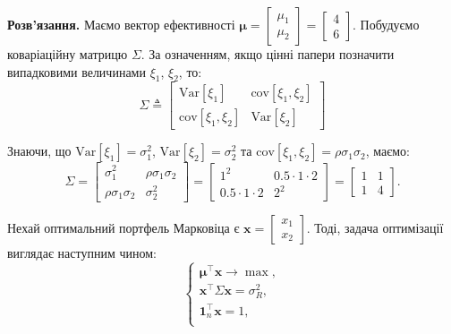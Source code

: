\documentclass{test_template}
\begin{document}
\textbf{Розв'язання.} Маємо вектор ефективності $\boldsymbol{\mu} = \begin{bmatrix}
    \mu_1 \\ 
    \mu_2 \end{bmatrix} = \begin{bmatrix} 4 \\ 6 \end{bmatrix}$. Побудуємо
коваріаційну матрицю $\Sigma$. За означенням, якщо цінні папери позначити 
випадковими величинами $\xi_1$, $\xi_2$, то:
\begin{equation*}
    \Sigma \triangleq \begin{bmatrix}
        \text{Var}[\xi_1] & \text{cov}[\xi_1,\xi_2] \\
        \text{cov}[\xi_1,\xi_2] & \text{Var}[\xi_2]
    \end{bmatrix}
\end{equation*}

Знаючи, що $\text{Var}[\xi_1] = \sigma_1^2$, $\text{Var}[\xi_2] = \sigma_2^2$ та
$\text{cov}[\xi_1,\xi_2] = \rho \sigma_1 \sigma_2$, маємо:
\begin{equation*}
    \Sigma = \begin{bmatrix}
        \sigma_1^2 & \rho\sigma_1\sigma_2 \\
        \rho\sigma_1\sigma_2 & \sigma_2^2
    \end{bmatrix} = \begin{bmatrix}
        1^2 & 0.5 \cdot 1 \cdot 2 \\
        0.5 \cdot 1 \cdot 2 & 2^2
    \end{bmatrix} = \begin{bmatrix}
        1 & 1 \\
        1 & 4
    \end{bmatrix}.
\end{equation*}

Нехай оптимальний портфель Марковіца є $\mathbf{x} = \begin{bmatrix} x_1 \\ x_2
    \end{bmatrix}$. Тоді, задача оптимізації виглядає наступним чином:
\begin{equation*}
    \begin{cases}
        \boldsymbol{\mu}^{\top}\mathbf{x} \to \max, \\
        \mathbf{x}^{\top}\Sigma\mathbf{x} = \sigma_R^2, \\
        \mathbf{1}_n^{\top}\mathbf{x} = 1, \\
    \end{cases}
\end{equation*}
\end{document}
